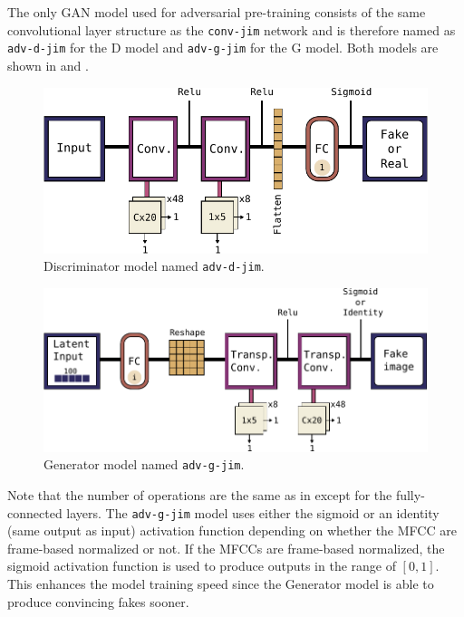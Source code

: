 The only GAN model used for adversarial pre-training consists of the same convolutional layer structure as the \texttt{conv-jim} network and is therefore named as \texttt{adv-d-jim} for the D model and \texttt{adv-g-jim} for the G model. 
Both models are shown in  and .
\begin{figure}[!ht]
  \centering
    \includegraphics[height=0.23\textwidth]{./4_nn/figs/nn_arch_adv_d_jim.pdf}
  \caption{Discriminator model named \texttt{adv-d-jim}.}
  \label{fig:nn_arch_adv_d_jim}
\end{figure}
\FloatBarrier
\noindent
\begin{figure}[!ht]
  \centering
    \includegraphics[height=0.26\textwidth]{./4_nn/figs/nn_arch_adv_g_jim.pdf}
  \caption{Generator model named \texttt{adv-g-jim}.}
  \label{fig:nn_arch_adv_g_jim}
\end{figure}
\FloatBarrier
\noindent
Note that the number of operations are the same as in  except for the fully-connected layers.
The \texttt{adv-g-jim} model uses either the sigmoid or an identity (same output as input) activation function depending on whether the MFCC are frame-based normalized or not.
If the MFCCs are frame-based normalized, the sigmoid activation function is used to produce outputs in the range of $[0, 1]$.
This enhances the model training speed since the Generator model is able to produce convincing fakes sooner.



